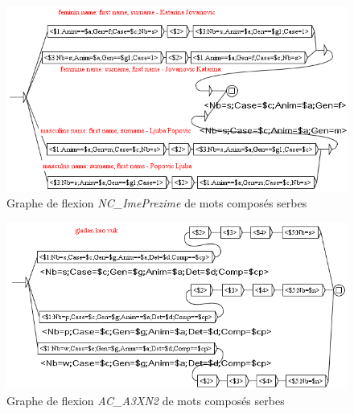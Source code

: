 \begin{figure}[!htb]
  \centering
  \includegraphics[width=15cm]{resources/img/NC'ImePrezime'SRB.png}
  \caption{Graphe de flexion \emph{NC\_ImePrezime} de mots composés serbes}
  \label{fig:NC'ImePrezime'SRB}
\end{figure}

\begin{figure}[!htb]
  \centering
  \includegraphics[width=15cm]{resources/img/AC'A3XN2'SRB.png}
  \caption{Graphe de flexion \emph{AC\_A3XN2} de mots composés serbes}
  \label{fig:AC'A3XN2'SRB}
\end{figure}


